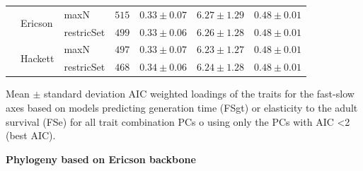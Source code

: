 \begin{table}[ht!]
\begin{tabular}{@{}lllllll@{}}
\addlinespace
\multirow{4}{*}{FSgt best AIC} & \multirow{2}{*}{Ericson} & maxN & $515$ &
$0.33\pm0.07$ & $6.27\pm1.29$ & $0.48\pm0.01$\\
 &  & restricSet & $499$ & $0.33\pm0.06$ & $6.26\pm1.28$ & $0.48\pm0.01$\\
 & \multirow{2}{*}{Hackett} & maxN & $497$ & $0.33\pm0.07$ & $6.23\pm1.27$ & $0.48\pm0.01$\\
 &  & restricSet & $468$ & $0.34\pm0.06$ & $6.24\pm1.28$ & $0.48\pm0.01$\\
\bottomrule
\end{tabular}
\end{table}


\clearpage%
\begin{landscape}
\begin{table}
\center
\caption[LHT loadings of the FS axes]{
Mean $\pm$ standard deviation AIC weighted loadings of the traits for the
fast-slow axes based on models predicting generation time (FSgt) or elasticity
to the adult survival (FSe) for all trait combination PCs o using only the PCs
with AIC \textless{2} (best AIC).
}
\label{tab:tabApp2.2}
\begin{footnotesize}

\textbf{Phylogeny based on Ericson backbone}


\end{footnotesize}
\end{table}
\end{landscape}
